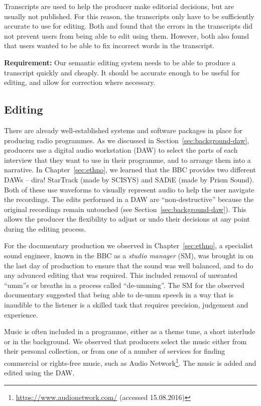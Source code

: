 Transcripts are used to help the producer make editorial decisions, but are usually not published. For this reason, the
transcripts only have to be sufficiently accurate to use for editing. Both \citet{Whittaker2004} and
\citet{Sivaraman2016} found that the errors in the transcripts did not prevent users from being able to edit using
them. However, both also found that users wanted to be able to fix incorrect words in the transcript.

\textbf{Requirement:} Our semantic editing system needs to be able to produce a transcript quickly and cheaply. It
should be accurate enough to be useful for editing, and allow for correction where necessary.

\subsection{Editing}
There are already well-established systems and software packages in place for producing radio programmes. As we discussed in
Section~\ref{sec:background-daw}, producers use a digital audio workstation (DAW) to select the parts of each interview
that they want to use in their programme, and to arrange them into a narrative. In Chapter~\ref{sec:ethno}, we learned
that the BBC provides two different DAWs --
dira! StarTrack (made by SCISYS) and SADiE (made by Prism Sound).
Both of these use waveforms to visually represent audio to help the user navigate the recordings. The edits performed
in a DAW are ``non-destructive'' because the original recordings remain untouched (see
Section~\ref{sec:background-daw}). This allows the producer the flexibility to adjust or undo their decisions at any
point during the editing process.

For the documentary production we observed in Chapter~\ref{sec:ethno}, a specialist sound engineer, known in the BBC as
a \textit{studio manager} (SM), was brought in on the last day of production to ensure that the sound was well
balanced, and to do any advanced editing that was required. This included removal of unwanted ``umm''s or breaths in a
process called ``de-umming''. The SM for the observed documentary suggested that being able to de-umm speech in a way
that is inaudible to the listener is a skilled task that requires precision, judgement and experience.

Music is often included in a programme, either as a theme tune, a short interlude or in the background. We observed
that producers
select the music either from their personal collection, or from one of a number of services for finding
commercial or rights-free music, such as Audio Network\footnote{\url{https://www.audionetwork.com/} (accessed
15.08.2016)}.  The music is added and edited using the DAW.

